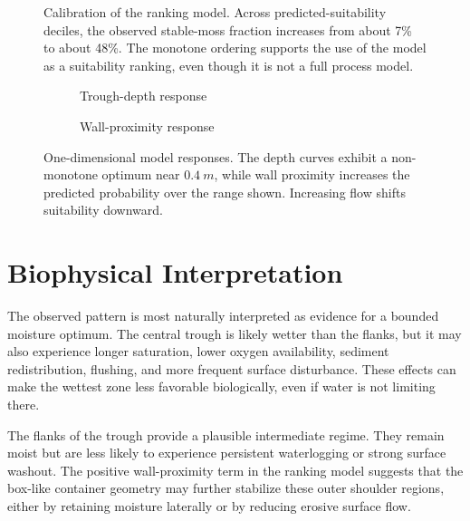 \documentclass[11pt,a4paper]{article}
\begin{document}
\begin{figure}[H]
  \centering
  \caption{Calibration of the ranking model. Across predicted-suitability
  deciles, the observed stable-moss fraction increases from about 7\% to about
  48\%. The monotone ordering supports the use of the model as a suitability
  ranking, even though it is not a full process model.}
  \label{fig:calibration}
\end{figure}

\begin{figure}[H]
  \centering
  \begin{subfigure}[t]{0.47\linewidth}
    \centering
    \caption{Trough-depth response}
  \end{subfigure}
  \hfill
  \begin{subfigure}[t]{0.47\linewidth}
    \centering
    \caption{Wall-proximity response}
  \end{subfigure}
  \caption{One-dimensional model responses. The depth curves exhibit a
  non-monotone optimum near \(\SI{0.4}{m}\), while wall proximity increases the
  predicted probability over the range shown. Increasing flow shifts suitability
  downward.}
  \label{fig:model-response-curves}
\end{figure}

\section{Biophysical Interpretation}

The observed pattern is most naturally interpreted as evidence for a bounded
moisture optimum. The central trough is likely wetter than the flanks, but it
may also experience longer saturation, lower oxygen availability, sediment
redistribution, flushing, and more frequent surface disturbance. These effects
can make the wettest zone less favorable biologically, even if water is not
limiting there.

The flanks of the trough provide a plausible intermediate regime. They remain
moist but are less likely to experience persistent waterlogging or strong
surface washout. The positive wall-proximity term in the ranking model suggests
that the box-like container geometry may further stabilize these outer shoulder
regions, either by retaining moisture laterally or by reducing erosive surface
flow.
\end{document}
